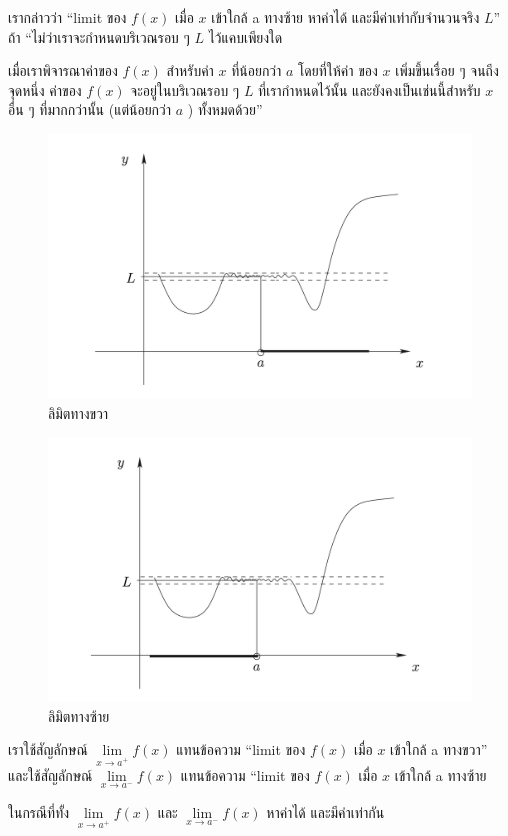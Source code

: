 \documentclass[
]{book}
\begin{document}
เรากล่าวว่า ``limit ของ \(f(x)\) เมื่อ \(x\) เข้าใกล้ a ทางซ้าย หาค่าได้
และมีค่าเท่ากับจำนวนจริง \(L\)'' ถ้า ``ไม่ว่าเราจะกำหนดบริเวณรอบ ๆ \(L\)
ไว้แคบเพียงใด

เมื่อเราพิจารณาค่าของ \(f(x)\) สำหรับค่า \(x\) ที่น้อยกว่า \(a\) โดยที่ให้ค่า ของ
\(x\) เพิ่มขึ้นเรื่อย ๆ จนถีงจุดหนึ่ง ค่าของ \(f(x)\) จะอยู่ในบริเวณรอบ ๆ \(L\)
ที่เรากำหนดไว้นั้น และยังคงเป็นเช่นนี้สำหรับ \(x\) อื่น ๆ ที่มากกว่านั้น (แต่น้อยกว่า \(a\) )
ทั้งหมดด้วย''

\begin{figure}

{\centering \includegraphics[width=0.5\linewidth]{images/fig-right-limit} 

}

\caption{ลิมิตทางขวา}\label{fig:fig-right-limit}
\end{figure}

\begin{figure}

{\centering \includegraphics[width=0.5\linewidth]{images/fig-left-limit} 

}

\caption{ลิมิตทางซ้าย}\label{fig:fig-left-limit}
\end{figure}

เราใช้สัญลักษณ์ \(\underset{x\rightarrow a^{+}}{\lim}f(x)\) แทนข้อความ
``limit ของ \(f(x)\) เมื่อ \(x\) เข้าใกล้ a ทางขวา'' และใช้สัญลักษณ์
\(\underset{x\rightarrow a^{-}}{\lim}f(x)\) แทนข้อความ ``limit ของ
\(f(x)\) เมื่อ \(x\) เข้าใกล้ a ทางซ้าย

\label{def-limit-2}
ในกรณีที่ทั้ง \(\underset{x\rightarrow a^{+}}{\lim}f(x)\) และ
\(\underset{x\rightarrow a^{-}}{\lim}f(x)\) หาค่าได้ และมีค่าเท่ากัน
\end{document}

